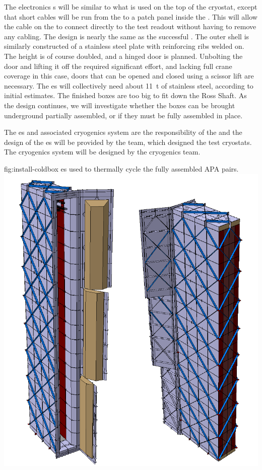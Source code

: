  
The \coldbox electronics \fdth{}s  will be  similar to what is used on the top of the  cryostat, except that short cables will be run from the   to a patch panel inside the \coldbox. This will allow the cable on the  to connect directly to the test readout without having to remove any cabling. The \coldbox  design is nearly the same as the successful  \coldbox. The outer shell is similarly constructed of a stainless steel plate with reinforcing ribs welded on. The height is of course doubled, and a hinged door is planned. Unbolting the door and lifting it off the  \coldbox required significant effort, and lacking full crane coverage in this case, doors that can be opened and closed using a scissor lift are necessary. The  \coldbox{}es will collectively need about \SI{11}{t} of stainless steel, according to initial estimates. The finished boxes are too big to fit down the Ross Shaft. As the design continues, 
we will investigate whether the boxes can be brought underground partially assembled, or if they must be fully assembled in place.  

The \coldbox{}es and associated cryogenics system are the responsibility of the  and the design of the \coldbox{}es will be provided by the  team, which designed the  test cryostats. The cryogenics system will be designed by the  cryogenics team. 

\begin{dunefigure}{fig:install-coldbox}
  {\Coldbox{}es used to thermally cycle the fully assembled APA pairs. }
\includegraphics[width=.5\textwidth]{graphics/install-coldbox.pdf}
\end{dunefigure}




